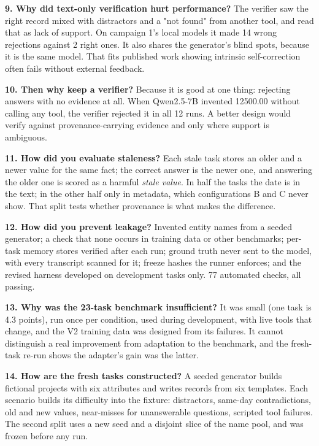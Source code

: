 \documentclass[10.5pt,a4paper,oneside]{report}
\begin{document}
\textbf{9. Why did text-only verification hurt performance?} The verifier saw the right record mixed with distractors and a "not found" from another tool, and read that as lack of support. On campaign 1's local models it made 14 wrong rejections against 2 right ones. It also shares the generator's blind spots, because it is the same model. That fits published work showing intrinsic self-correction often fails without external feedback.

\textbf{10. Then why keep a verifier?} Because it is good at one thing: rejecting answers with no evidence at all. When Qwen2.5-7B invented 12500.00 without calling any tool, the verifier rejected it in all 12 runs. A better design would verify against provenance-carrying evidence and only where support is ambiguous.

\textbf{11. How did you evaluate staleness?} Each stale task stores an older and a newer value for the same fact; the correct answer is the newer one, and answering the older one is scored as a harmful \emph{stale value}. In half the tasks the date is in the text; in the other half only in metadata, which configurations B and C never show. That split tests whether provenance is what makes the difference.

\textbf{12. How did you prevent leakage?} Invented entity names from a seeded generator; a check that none occurs in training data or other benchmarks; per-task memory stores verified after each run; ground truth never sent to the model, with every transcript scanned for it; freeze hashes the runner enforces; and the revised harness developed on development tasks only. 77 automated checks, all passing.

\textbf{13. Why was the 23-task benchmark insufficient?} It was small (one task is 4.3 points), run once per condition, used during development, with live tools that change, and the V2 training data was designed from its failures. It cannot distinguish a real improvement from adaptation to the benchmark, and the fresh-task re-run shows the adapter's gain was the latter.

\textbf{14. How are the fresh tasks constructed?} A seeded generator builds fictional projects with six attributes and writes records from six templates. Each scenario builds its difficulty into the fixture: distractors, same-day contradictions, old and new values, near-misses for unanswerable questions, scripted tool failures. The second split uses a new seed and a disjoint slice of the name pool, and was frozen before any run.
\end{document}
